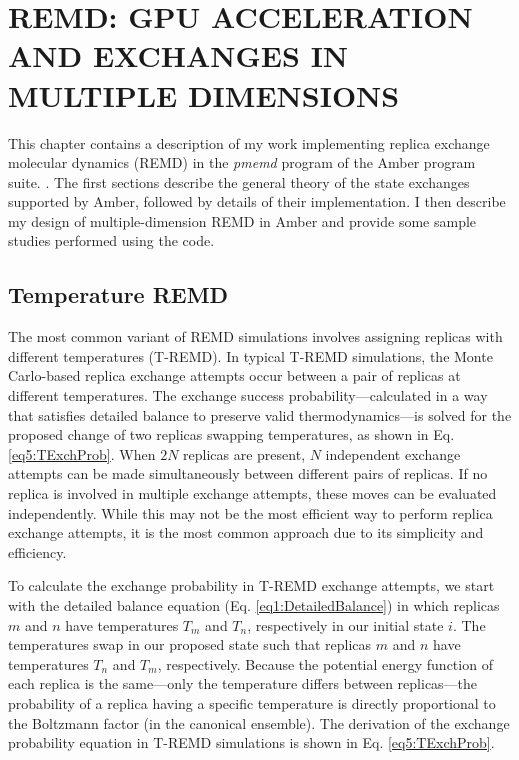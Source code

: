 \chapter{REMD: GPU ACCELERATION AND EXCHANGES IN MULTIPLE DIMENSIONS}
\label{ch5}

This chapter contains a description of my work implementing replica exchange
molecular dynamics (REMD) in the \emph{pmemd} program of the Amber program
suite. \cite{AMBER12}. The first sections describe the general theory of the
state exchanges supported by Amber, followed by details of their implementation.
I then describe my design of multiple-dimension REMD in Amber and provide some
sample studies performed using the code.

\section{Temperature REMD}

The most common variant of REMD simulations involves assigning replicas with
different temperatures (T-REMD). \cite{Sugita_ChemPhysLett_1999_v314_p141} In
typical T-REMD simulations, the Monte Carlo-based replica exchange attempts
occur between a pair of replicas at different temperatures. The exchange success
probability---calculated in a way that satisfies detailed balance to preserve
valid thermodynamics---is solved for the proposed change of two replicas
swapping temperatures, as shown in Eq. \ref{eq5:TExchProb}.  When $2N$ replicas
are present, $N$ independent exchange attempts can be made simultaneously
between different pairs of replicas. If no replica is involved in multiple
exchange attempts, these moves can be evaluated independently. While this may
not be the most efficient way to perform replica exchange attempts, it is the
most common approach due to its simplicity and efficiency.

To calculate the exchange probability in T-REMD exchange attempts, we start with
the detailed balance equation (Eq. \ref{eq1:DetailedBalance}) in which replicas
$m$ and $n$ have temperatures $T_m$ and $T_n$, respectively in our initial state
$i$. The temperatures swap in our proposed state such that replicas $m$ and $n$
have temperatures $T_n$ and $T_m$, respectively. Because the potential energy
function of each replica is the same---only the temperature differs between
replicas---the probability of a replica having a specific temperature is
directly proportional to the Boltzmann factor (in the canonical ensemble). The
derivation of the exchange probability equation in T-REMD simulations is shown
in Eq. \ref{eq5:TExchProb}.


